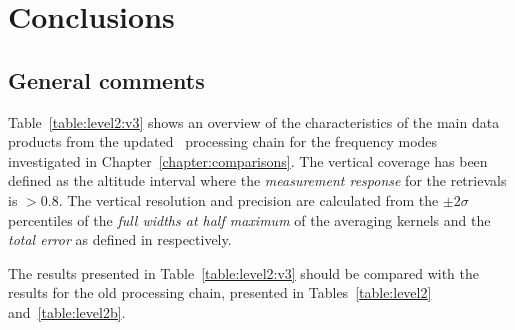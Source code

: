 \chapter{Conclusions}
\label{chapter:conclusions}
\section{General comments}


Table~\ref{table:level2:v3} shows an overview of the characteristics of the
main data products from the updated \smr\ processing chain for the frequency
modes investigated in Chapter~\ref{chapter:comparisons}. The vertical coverage
has been defined as the altitude interval where the \emph{measurement response}
for the retrievals is $>0.8$. The vertical resolution and precision are
calculated from the $\pm 2\sigma$ percentiles of the \emph{full widths at half
maximum} of the averaging kernels and the \emph{total error} as defined in \cite{atbdl2}  respectively.

The results presented in Table~\ref{table:level2:v3} should be compared with
the results for the old processing chain, presented in
Tables~\ref{table:level2} and~\ref{table:level2b}.

